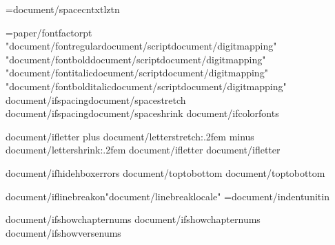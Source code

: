 \XeTeXinterwordspaceshaping={document/spacecntxtlztn}

={paper/fontfactor}pt
\def\regular{L_}{{"{document/fontregular}{document/script}{document/digitmapping}"}}
\def\bold{L_}{{"{document/fontbold}{document/script}{document/digitmapping}"}}
\def\italic{L_}{{"{document/fontitalic}{document/script}{document/digitmapping}"}}
\def\bolditalic{L_}{{"{document/fontbolditalic}{document/script}{document/digitmapping}"}}
{document/ifspacing}\def\SpaceStretchFactor{L_}{{{document/spacestretch}}}
{document/ifspacing}\def\SpaceShrinkFactor{L_}{{{document/spaceshrink}}}
{document/ifcolorfonts}\ColorFontsfalse


{document/ifletter}\newskip\intercharskip \intercharskip=0pt plus {document/letterstretch:.2f}em minus {document/lettershrink:.2f}em
{document/ifletter}\def\letterspace{{\leavevmode\nobreak\hskip\intercharskip}}
{document/ifletter}\DefineActiveChar{{^^^^fdd0}}{{\letterspace}}


{document/ifhidehboxerrors}\overfullrule=0pt
{document/toptobottom}     %
{document/toptobottom}\rotatetrue

{document/iflinebreakon}\XeTeXlinebreaklocale "{document/linebreaklocale}"
\IndentUnit={document/indentunit}in

{document/ifshowchapternums}\OmitChapterNumbertrue
{document/ifshowchapternums}\def\AfterChapterSpaceFactor{{10}}
{document/ifshowversenums}\def\AfterVerseSpaceFactor{{0}}

